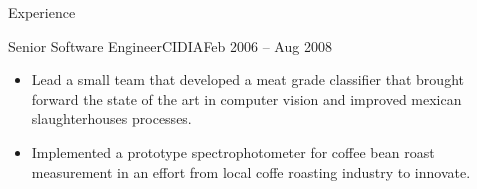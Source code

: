 \documentclass{mcdowellcv}
\begin{document}
\begin{cvsection}{Experience}
\begin{cvsubsection}{Senior Software Engineer}{CIDIA}{Feb 2006 -- Aug 2008}
\begin{itemize}
      progress on a optical profilometry research.
    \item Lead a small team that developed a meat grade classifier that brought
      forward the state of the art in computer vision and improved mexican
      slaughterhouses processes.
    \item Implemented a prototype spectrophotometer for coffee bean roast
      measurement in an effort from local coffe roasting industry to innovate.
		\end{itemize}
	\end{cvsubsection}
\end{cvsection}
\end{document}
